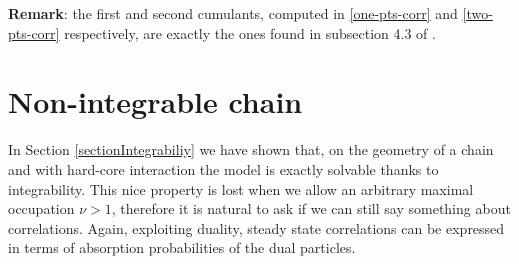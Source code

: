 \documentclass[11pt]{article}
\numberwithin{equation}{section}
\numberwithin{equation}{subsection}
\begin{document}
\textbf{Remark}: the first and second cumulants, computed in \eqref{one-pts-corr} and \eqref{two-pts-corr} respectively, are exactly the ones found in subsection 4.3 of \cite{vanicat2017exact}. 

\section{Non-integrable chain}
In Section \ref{sectionIntegrabiliy} we have shown that, on the geometry of a chain and with hard-core interaction the model is exactly solvable thanks to integrability. This nice property is lost when we allow an arbitrary maximal occupation $\nu>1$, therefore it is natural to ask if we can still say something about correlations. Again, exploiting duality, steady state correlations can be expressed in terms of absorption probabilities of the dual particles.
\end{document}
